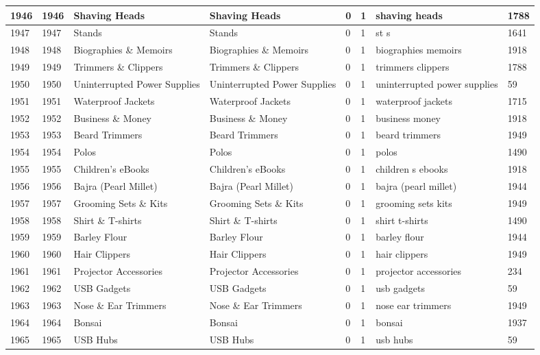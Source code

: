 \begin{longtable}{|l|l|l|l|l|l|l|l|}
1946 & 1946 & Shaving Heads & Shaving Heads & 0 & 1 & shaving heads & 1788 \\ \hline 
1947 & 1947 & Stands & Stands & 0 & 1 & st s & 1641 \\ \hline 
1948 & 1948 & Biographies \& Memoirs & Biographies \& Memoirs & 0 & 1 & biographies memoirs & 1918 \\ \hline 
1949 & 1949 & Trimmers \& Clippers & Trimmers \& Clippers & 0 & 1 & trimmers clippers & 1788 \\ \hline 
1950 & 1950 & Uninterrupted Power Supplies & Uninterrupted Power Supplies & 0 & 1 & uninterrupted power supplies & 59 \\ \hline 
1951 & 1951 & Waterproof Jackets & Waterproof Jackets & 0 & 1 & waterproof jackets & 1715 \\ \hline 
1952 & 1952 & Business \& Money & Business \& Money & 0 & 1 & business money & 1918 \\ \hline 
1953 & 1953 & Beard Trimmers & Beard Trimmers & 0 & 1 & beard trimmers & 1949 \\ \hline 
1954 & 1954 & Polos & Polos & 0 & 1 & polos & 1490 \\ \hline 
1955 & 1955 & Children's eBooks & Children's eBooks & 0 & 1 & children s ebooks & 1918 \\ \hline 
1956 & 1956 & Bajra (Pearl Millet) & Bajra (Pearl Millet) & 0 & 1 & bajra (pearl millet) & 1944 \\ \hline 
1957 & 1957 & Grooming Sets \& Kits & Grooming Sets \& Kits & 0 & 1 & grooming sets kits & 1949 \\ \hline 
1958 & 1958 & Shirt \& T-shirts & Shirt \& T-shirts & 0 & 1 & shirt t-shirts & 1490 \\ \hline 
1959 & 1959 & Barley Flour & Barley Flour & 0 & 1 & barley flour & 1944 \\ \hline 
1960 & 1960 & Hair Clippers & Hair Clippers & 0 & 1 & hair clippers & 1949 \\ \hline 
1961 & 1961 & Projector Accessories & Projector Accessories & 0 & 1 & projector accessories & 234 \\ \hline 
1962 & 1962 & USB Gadgets & USB Gadgets & 0 & 1 & usb gadgets & 59 \\ \hline 
1963 & 1963 & Nose \& Ear Trimmers & Nose \& Ear Trimmers & 0 & 1 & nose ear trimmers & 1949 \\ \hline 
1964 & 1964 & Bonsai & Bonsai & 0 & 1 & bonsai & 1937 \\ \hline 
1965 & 1965 & USB Hubs & USB Hubs & 0 & 1 & usb hubs & 59 \\ \hline 

\end{longtable}
